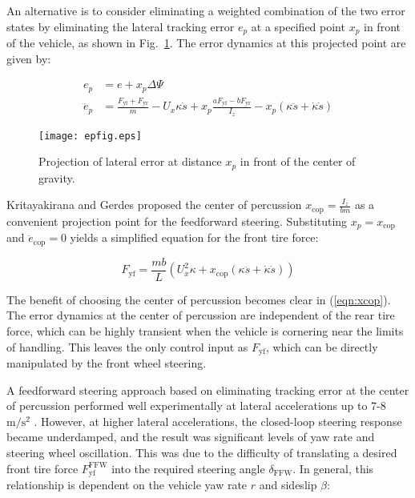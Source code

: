 An alternative is to consider eliminating a weighted combination of the two error states by eliminating the lateral tracking 
error $e_p$ at a specified point $x_p$ in front of the vehicle, as shown in Fig.~\ref{fig:projerr}. The error dynamics at this projected point are given by: 

\begin{subequations}
\label{eqn:xp}
\begin{align}
	e_p        &= e + x_p\Delta\Psi \\
	\ddot{e}_p &= \frac{F_\mathrm{yf} + F_\mathrm{yr}}{m} - U_x\kappa\dot{s} + x_p\frac{aF_\mathrm{yf} - bF_\mathrm{yr}}{I_z} - x_p(\kappa\ddot{s} + \dot{\kappa}\dot{s})
\end{align}
\end{subequations}

\begin{figure}[h]
\centering
\texttt{[image: epfig.eps]}
\caption{Projection of lateral error at distance $x_p$ in front of the center of gravity.}
\label{fig:projerr}
\end{figure}

Kritayakirana and Gerdes \cite{mickcop} proposed the center of percussion $x_\mathrm{cop} = \frac{I_z}{bm}$ as a convenient projection point
for the feedforward steering. Substituting $x_p = x_\mathrm{cop}$ and $\ddot{e}_\mathrm{cop} = 0$  yields a simplified equation for the front tire force:

\begin{equation}
\label{eqn:xcop}
 F_\mathrm{yf} = \frac{mb}{L}\left(U_x^2\kappa + x_\mathrm{cop}(\kappa\ddot{s} + \dot{\kappa}\dot{s})\right)
\end{equation}

The benefit of choosing the center of percussion becomes clear in (\ref{eqn:xcop}). The error dynamics at the
center of percussion are independent of the rear tire force, which can be highly transient when the vehicle is cornering near the
limits of handling. This leaves the only control input as $F_\mathrm{yf}$, which can be directly
manipulated by the front wheel steering. 

A feedforward steering approach based on eliminating tracking error at the center of percussion performed well experimentally at lateral accelerations up to
7-8 $\mathrm{m/s^2}$ \cite{mickcop}. However, at higher lateral accelerations, the closed-loop steering response became underdamped, and
the result was significant levels of yaw rate and steering wheel oscillation. This was due to the difficulty of translating a
desired front tire force $F^\mathrm{FFW}_\mathrm{yf}$ into the required steering angle $\delta_\mathrm{FFW}$. 
In general, this relationship is dependent on the vehicle yaw rate $r$ and sideslip $\beta$:

